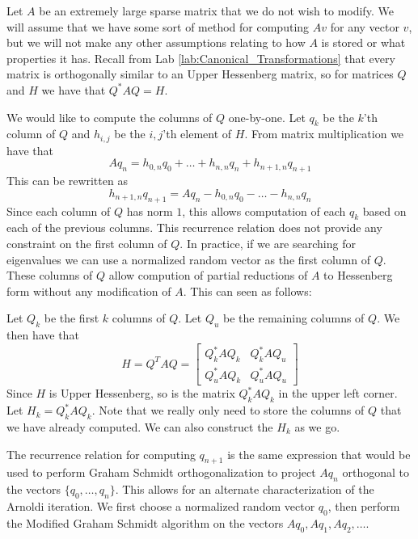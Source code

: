 Let $A$ be an extremely large sparse matrix that we do not wish to modify.
We will assume that we have some sort of method for computing $A v$ for any vector $v$, but we will not make any other assumptions relating to how $A$ is stored or what properties it has.
Recall from Lab \ref{lab:Canonical_Transformations} that every matrix is orthogonally similar to an Upper Hessenberg matrix, so for matrices $Q$ and $H$ we have that $Q^* A Q = H$.

We would like to compute the columns of $Q$ one-by-one.
Let $q_k$ be the $k$'th column of $Q$ and $h_{i,j}$ be the $i,j$'th element of $H$.
From matrix multiplication we have that 
\[A q_n = h_{0, n} q_0 + \dots + h_{n, n} q_n + h_{n+1, n} q_{n+1}\]
This can be rewritten as
\[h_{n+1, n} q_{n+1} = A q_n - h_{0,n} q_0 - \dots - h_{n,n} q_n\]
Since each column of $Q$ has norm $1$, this allows computation of each $q_k$ based on each of the previous columns.
This recurrence relation does not provide any constraint on the first column of $Q$.
In practice, if we are searching for eigenvalues we can use a normalized random vector as the first column of $Q$.
These columns of $Q$ allow compution of partial reductions of $A$ to Hessenberg form without any modification of $A$.
This can seen as follows:

Let $Q_k$ be the first $k$ columns of $Q$.
Let $Q_u$ be the remaining columns of $Q$.
We then have that
\[H = Q^T A Q =
\begin{bmatrix}
Q_k^* A Q_k & Q_k^* A Q_u \\
Q_u^* A Q_k & Q_u^* A Q_u
\end{bmatrix}\]
Since $H$ is Upper Hessenberg, so is the matrix $Q_k^* A Q_k$ in the upper left corner.
Let $H_k = Q_k^* A Q_k$.
Note that we really only need to store the columns of $Q$ that we have already computed.
We can also construct the $H_k$ as we go.

\begin{info}
The recurrence relation for computing $q_{n+1}$ is the same expression that would be used to perform Graham Schmidt orthogonalization to project $A q_n$ orthogonal to the vectors $\{ q_0, \dots, q_n \}$.
This allows for an alternate characterization of the Arnoldi iteration.
We first choose a normalized random vector $q_0$, then perform the Modified Graham Schmidt algorithm on the vectors $A q_0, A q_1, A q_2, \dots$.
\end{info}

